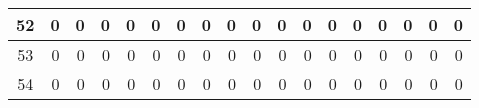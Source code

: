 \begin{table}[ht]
\begin{adjustbox}{width = \textwidth, center}
\begin{tabular}{|c|r|r|r|r|r|r|r|r|r|r|r|r|r|r|r|r|r|}
            \rowcolor[HTML]{FFFFFF} 
            \cellcolor[HTML]{CFE2F3}52                           & 0                                              & 0                                              & 0                                              & 0                                              & 0                                              & 0                                              & 0                                              & 0                                               & 0                                               & 0                                               & 0                                               & 0                                               & 0                                               & 0                                               & 0                                               & \cellcolor[HTML]{D9D2E9}0                                                             & \cellcolor[HTML]{D9D2E9}0                                                                 \\ \hline
            \rowcolor[HTML]{FFFFFF} 
            \cellcolor[HTML]{CFE2F3}53                           & 0                                              & 0                                              & 0                                              & 0                                              & 0                                              & 0                                              & 0                                              & 0                                               & 0                                               & 0                                               & 0                                               & 0                                               & 0                                               & 0                                               & 0                                               & \cellcolor[HTML]{D9D2E9}0                                                             & \cellcolor[HTML]{D9D2E9}0                                                                 \\ \hline
            \rowcolor[HTML]{FFFFFF} 
            \cellcolor[HTML]{CFE2F3}54                           & 0                                              & 0                                              & 0                                              & 0                                              & 0                                              & 0                                              & 0                                              & 0                                               & 0                                               & 0                                               & 0                                               & 0                                               & 0                                               & 0                                               & 0                                               & \cellcolor[HTML]{D9D2E9}0                                                             & \cellcolor[HTML]{D9D2E9}0                                                                 \\ \hline

\end{tabular}
\end{adjustbox}
\end{table}
